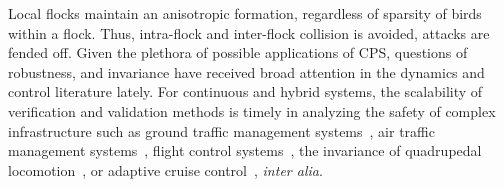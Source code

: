 Local flocks maintain an anisotropic formation, regardless of sparsity of birds within a flock. Thus, intra-flock and inter-flock collision is avoided, attacks are fended off. %
%
%
%
Given the plethora of possible applications of CPS, questions of robustness, and invariance have received broad attention in the dynamics and control literature lately. For continuous and hybrid systems, the scalability of  verification and validation methods is timely in analyzing the safety of complex infrastructure such as ground traffic management systems~\cite{GroundTrafficMgt}, air traffic management systems~\cite{Tomlin2000Game}, flight control systems~\cite{Mitchell2020, SylviaScalability}, the invariance of quadrupedal locomotion~\cite{QuadCBF}, or adaptive cruise control~\cite{CBFCruiseControl}, \textit{inter alia}. 


